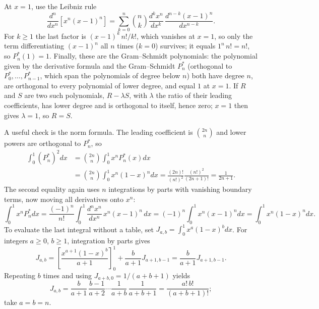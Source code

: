 At $x=1$, use the Leibniz rule
\[
\frac{d^n}{dx^n}[x^n(x-1)^n]=\sum_{k=0}^n\binom nk
\frac{d^kx^n}{dx^k}\,\frac{d^{n-k}(x-1)^n}{dx^{n-k}}.
\]
For $k\ge1$ the last factor is $(x-1)^k\,n!/k!$, which vanishes at
$x=1$, so only the term differentiating $(x-1)^n$ all $n$ times ($k=0$)
survives; it equals $1^n\,n!=n!$, so $P_n^*(1)=1$.
Finally, these are the Gram--Schmidt polynomials: the polynomial given by
the derivative formula and the Gram--Schmidt $P_n^*$ (orthogonal to
$P_0^*,\ldots,P_{n-1}^*$, which span the polynomials of degree below $n$)
both have degree $n$, are orthogonal to every polynomial of lower degree,
and equal $1$ at $x=1$. If $R$ and $S$ are two such polynomials,
$R-\lambda S$, with $\lambda$ the ratio of their leading coefficients, has
lower degree and is orthogonal to itself, hence zero; $x=1$ then gives
$\lambda=1$, so $R=S$.

A useful check is the norm formula. The leading coefficient is
$\binom{2n}n$ and lower powers are orthogonal to $P_n^*$, so
\begin{align*}
\int_0^1(P_n^*)^2dx
&=\binom{2n}n\int_0^1x^nP_n^*(x)dx\\
&=\binom{2n}n\int_0^1x^n(1-x)^n dx
=\frac{(2n)!}{(n!)^2}\frac{(n!)^2}{(2n+1)!}
=\frac1{2n+1}.
\end{align*}
The second equality again uses $n$ integrations by parts with vanishing
boundary terms, now moving all derivatives onto $x^n$:
\[
\int_0^1x^nP_n^*dx
=\frac{(-1)^n}{n!}\int_0^1\frac{d^nx^n}{dx^n}\,x^n(x-1)^n\,dx
=(-1)^n\int_0^1x^n(x-1)^ndx=\int_0^1x^n(1-x)^ndx.
\]
To evaluate the
last integral without a table, set $J_{a,b}=\int_0^1x^a(1-x)^b dx$.
For integers $a\ge0$, $b\ge1$, integration by parts gives
\[
J_{a,b}=\left[\frac{x^{a+1}(1-x)^b}{a+1}\right]_0^1
 +\frac b{a+1}J_{a+1,b-1}=\frac b{a+1}J_{a+1,b-1}.
\]
Repeating $b$ times and using $J_{a+b,0}=1/(a+b+1)$ yields
\[
J_{a,b}=\frac b{a+1}\,\frac{b-1}{a+2}\cdots\frac1{a+b}\,\frac1{a+b+1}
=\frac{a!\,b!}{(a+b+1)!};
\]
take $a=b=n$.

